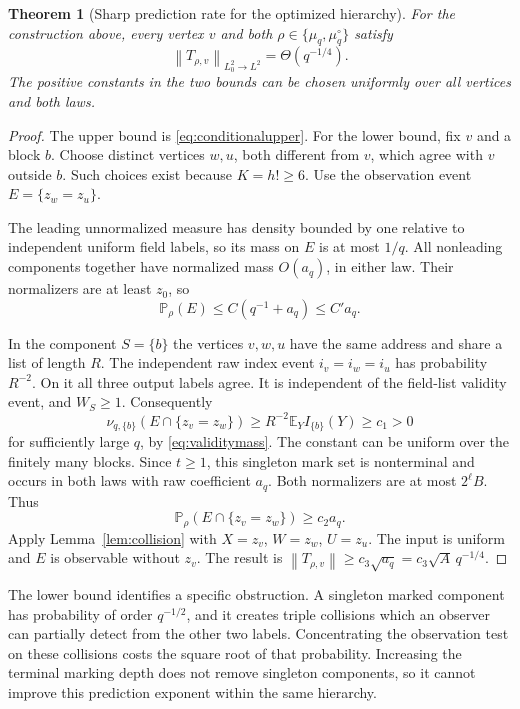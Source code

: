 \documentclass[11pt,a4paper]{article}
\numberwithin{equation}{section}
\newtheorem{theorem}{Theorem}[section]
\theoremstyle{definition}
\theoremstyle{remark}
\newcommand{\E}{\mathbb E}
\newcommand{\Prob}{\mathbb P}
\newcommand{\norm}[1]{\left\lVert #1\right\rVert}
\begin{document}
\begin{theorem}[Sharp prediction rate for the optimized hierarchy]
\label{thm:sharpconditional}
For the construction above, every vertex $v$ and both
$\rho\in\{\mu_q,\mu_q^\circ\}$ satisfy
\begin{equation}
 \boxed{\qquad
 \norm{T_{\rho,v}}_{L^2_0\to L^2}=\Theta(q^{-1/4}).
 \qquad}
 \label{eq:sharpconditional}
\end{equation}
The positive constants in the two bounds can be chosen uniformly
over all vertices and both laws.
\end{theorem}
\begin{proof}
The upper bound is \eqref{eq:conditionalupper}. For the lower bound,
fix $v$ and a block $b$. Choose distinct vertices $w,u$, both different
from $v$, which agree with $v$ outside $b$. Such choices exist because
$K=h!\ge6$. Use the observation event $E=\{z_w=z_u\}$.

The leading unnormalized measure has density bounded by one relative
to independent uniform field labels, so its mass on $E$ is at most
$1/q$. All nonleading components together have normalized mass
$O(a_q)$, in either law. Their normalizers are at least $z_0$, so
\begin{equation}
 \Prob_\rho(E)\le C(q^{-1}+a_q)\le C'a_q.
 \label{eq:collisionupperE}
\end{equation}

In the component $S=\{b\}$ the vertices $v,w,u$ have the same
address and share a list of length $R$. The independent raw index
event $i_v=i_w=i_u$ has probability $R^{-2}$. On it all three output
labels agree. It is independent of the field-list validity event,
and $W_S\ge1$. Consequently
\[
 \nu_{q,\{b\}}(E\cap\{z_v=z_w\})
 \ge R^{-2}\E_YI_{\{b\}}(Y)\ge c_1>0
\]
for sufficiently large $q$, by \eqref{eq:validitymass}. The constant
can be uniform over the finitely many blocks. Since $t\ge1$, this
singleton mark set is nonterminal and occurs in both laws with raw
coefficient $a_q$. Both normalizers are at most $2^\ell B$. Thus
\begin{equation}
 \Prob_\rho(E\cap\{z_v=z_w\})\ge c_2a_q.
 \label{eq:collisionjoint}
\end{equation}
Apply Lemma~\ref{lem:collision} with $X=z_v$, $W=z_w$, $U=z_u$.
The input is uniform and $E$ is observable without $z_v$. The result
is $\norm{T_{\rho,v}}\ge c_3\sqrt{a_q}=c_3\sqrt A\,q^{-1/4}$.
\end{proof}

The lower bound identifies a specific obstruction. A singleton marked
component has probability of order $q^{-1/2}$, and it creates triple
collisions which an observer can partially detect from the other two
labels. Concentrating the observation test on these collisions costs
the square root of that probability. Increasing the terminal marking
depth does not remove singleton components, so it cannot improve this
prediction exponent within the same hierarchy.
\end{document}
